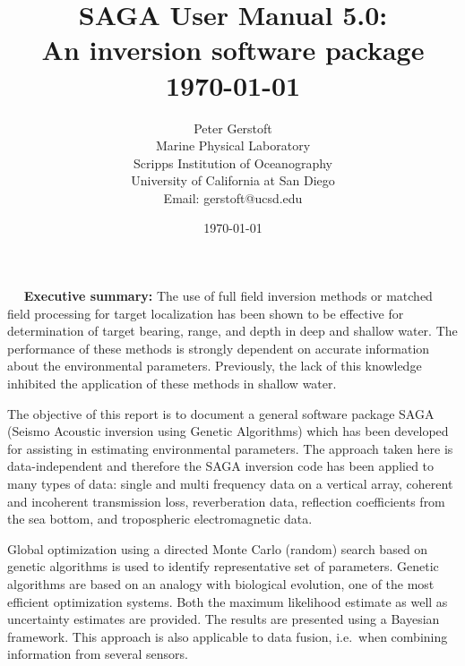 \documentclass{saclantc}
\title{SAGA User Manual 5.0:\\
An inversion software package\\ 
{\large \today}}
\author{\center Peter Gerstoft\\
           Marine Physical Laboratory \\
Scripps Institution of Oceanography\\
           University of California at San Diego\\
Email: gerstoft@ucsd.edu}
\date{\today}
\begin{document}
\begin{prelims}
~~
\newpage
{\bf Executive summary:}
The use of full field inversion methods or matched field processing
for target localization has been shown to be effective for
determination of target bearing, range, and depth in deep and shallow water. The performance of
these methods is strongly dependent on accurate information
about the environmental parameters. Previously, the lack of this
knowledge  inhibited the application of these methods in shallow water. 

The objective of this
report is to document a general software package {\sf SAGA} ({\sf S}eismo
{\sf A}coustic inversion using {\sf G}enetic {\sf A}lgorithms) which
has been developed
for assisting in estimating environmental parameters.
The approach taken here is data-independent and therefore the {\sf
SAGA} inversion code has
been applied to many types of data: single and multi
frequency data on a vertical array, coherent and incoherent
transmission loss, reverberation data, reflection coefficients from the
sea bottom, and tropospheric electromagnetic data.


Global
optimization using a directed Monte Carlo (random) search based on genetic
algorithms is used to identify representative set of parameters. 
Genetic algorithms are based on an analogy with
biological evolution, one of the most efficient optimization systems. 
Both the maximum likelihood estimate as well as uncertainty
estimates are provided. The results are presented using a Bayesian
framework. This approach is also applicable to data 
fusion, i.e.\ when combining information from several sensors.


 
\newpage


\end{prelims}
\end{document}
